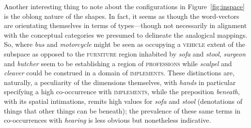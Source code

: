 Another interesting thing to note about the configurations in Figure~\ref{fig:inspace} is the oblong nature of the shapes.  In fact, it seems as though the word-vectors are orientating themselves in terms of types---though not necessarily in alignment with the conceptual categories we presumed to delineate the analogical mappings.  So, where \emph{bus} and \emph{motorcycle} might be seen as occupying a \textsc{vehicle} extent of the subspace as opposed to the \textsc{furniture} region inhabited by \emph{sofa} and \emph{stool}, \emph{surgeon} and \emph{butcher} seem to be establishing a region of \textsc{professions} while \emph{scalpel} and \emph{cleaver} could be construed in a domain of \textsc{implements}.  These distinctions are, naturally, a peculiarity of the dimensions themselves, with \emph{hands} in particular specifying a high co-occurrence with \textsc{implements}, while the preposition \emph{beneath}, with its spatial intimations, remits high values for \emph{sofa} and \emph{stool} (denotations of things that other things can be beneath); the prevalence of these same terms in co-occurrences with \emph{hearing} is less obvious but nonetheless indicative.

